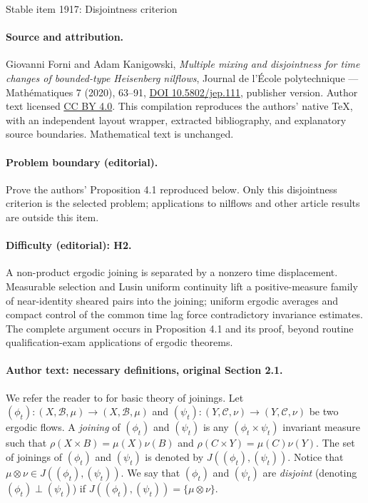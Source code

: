 \documentclass[11pt]{article}
\let\mathcal\mathscr
\theoremstyle{definition}
\theoremstyle{plain}
\newcommand\cB{\mathcal{B}}
\newcommand\cC{\mathcal{C}}
\begin{document}
\begin{center}{\Large Stable item 1917: Disjointness criterion}\end{center}
\paragraph{Source and attribution.}
Giovanni Forni and Adam Kanigowski, \emph{Multiple mixing and disjointness for time changes of bounded-type Heisenberg nilflows},
Journal de l'\'Ecole polytechnique --- Math\'ematiques 7 (2020), 63--91,
\href{https://doi.org/10.5802/jep.111}{DOI 10.5802/jep.111}, publisher version.
Author text licensed \href{https://creativecommons.org/licenses/by/4.0/}{CC BY 4.0}.
This compilation reproduces the authors' native TeX, with an independent layout wrapper, extracted bibliography, and explanatory source boundaries. Mathematical text is unchanged.
\paragraph{Problem boundary (editorial).}
Prove the authors' Proposition 4.1 reproduced below. Only this disjointness criterion is the selected problem; applications to nilflows and other article results are outside this item.
\paragraph{Difficulty (editorial): H2.}
A non-product ergodic joining is separated by a nonzero time displacement. Measurable selection and Lusin uniform continuity lift a positive-measure family of near-identity sheared pairs into the joining; uniform ergodic averages and compact control of the common time lag force contradictory invariance estimates. The complete argument occurs in Proposition 4.1 and its proof, beyond routine qualification-exam applications of ergodic theorems.
\paragraph{Author text: necessary definitions, original Section 2.1.}
We refer the reader to \cite{Gla} for basic theory of joinings.
Let $(\phi_t):(X,\cB,\mu)\to (X,\cB,\mu)$ and $(\psi_t):(Y,\cC,\nu)\to (Y,\cC,\nu)$ be two ergodic flows. A \emph{joining} of $(\phi_t)$ and $(\psi_t)$ is any $(\phi_t\times \psi_t)$ invariant measure such that $\rho(X\times B)=\mu(X)\nu(B)$ and $\rho(C\times Y)=\mu(C)\nu(Y)$. The set of joinings of $(\phi_t)$ and $(\psi_t)$ is denoted by $J((\phi_t),(\psi_t))$. Notice that $\mu\otimes \nu \in J((\phi_t),(\psi_t))$. We say that $(\phi_t)$ and $(\psi_t)$ are \emph{disjoint} (denoting $(\phi_t)\perp (\psi_t)$) if $J((\phi_t),(\psi_t))=\{\mu\otimes \nu\}$.
\end{document}
